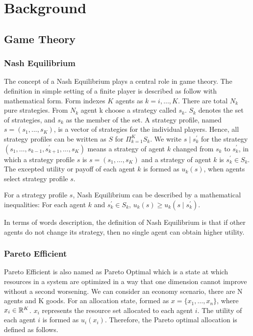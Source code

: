 \chapter{Background} \label{Chapter:Background}

\section{Game Theory}

\subsection{Nash Equilibrium}
The concept of a Nash Equilibrium plays a central role in game theory. The definition in simple setting of a finite player is described as follow with mathematical form. Form indexes $K$ agents as $k=i, \dots, K$. There are total $N_k$ pure strategies. From $N_k$ agent k choose a strategy called $s_k$. $S_k$ denotes the set of strategies, and $s_k$ as the member of the set. A strategy profile, named $s = (s_1, ..., s_K)$, is a vector of strategies for the individual players. Hence, all strategy profiles can be written as $S$ for $\Pi_{k=1}^{K} S_{k}$. We write $s \mid s_{k}^{\prime}$ for the strategy $\left(s_{1}, \ldots, s_{k-1}, s_{k+1}^{\prime}, \ldots, s_{K}\right)$ means a strategy of agent $k$ changed from $s_k$ to $s_{k}^{\prime}$, in which a strategy profile $s$ is $s = (s_1, ..., s_K)$ and a strategy of agent $k$ is $s_{k}^{\prime} \in S_{k}$. The excepted utility or payoff of each agent $k$ is formed as $u_k(s)$, when agents select strategy profile $s$\parencite{Kreps1989}.
\begin{proposition}
For a strategy profile $s$, Nash Equilibrium can be described by a mathematical inequalities: For each agent $k$ and $s_{k}^{\prime} \in S_{k}$, $u_{k}(s) \geqslant u_{k}\left(s \mid s_{k}^{\prime}\right)$.
\end{proposition}
In terms of words description, the definition of Nash Equilibrium is that if other agents do not change its strategy, then no single agent can obtain higher utility. 
 
\subsection{Pareto Efficient}
Pareto Efficient is also named as Pareto Optimal which is a state at which resources in a system are optimized in a way that one dimension cannot improve without a second worsening. We can consider an economy scenario, there are N agents and K goods. For an allocation state, formed as $x=\{x_1, \dots, x_n\}$, where $x_i \in \mathbb{R}^{K}$. $x_i$ represents the resource set allocated to each agent $i$. The utility of each agent $i$ is formed as $u_i(x_i)$. Therefore, the Pareto optimal allocation is defined as follows.

